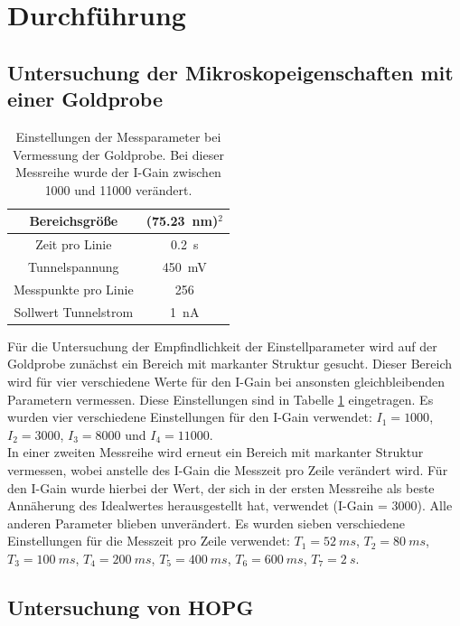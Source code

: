 \documentclass[12pt,a4paper]{article}
\begin{document}
\section{Durchführung}
\subsection{Untersuchung der Mikroskopeigenschaften mit einer Goldprobe}

\begin{table}
\centering
\begin{tabular}{|c|c|}
\hline 
Bereichsgröße & (\SI{75,23}{nm})$^2$ \\ 
\hline 
Zeit pro Linie & \SI{0,2}{s} \\
\hline 
Tunnelspannung & \SI{450}{mV} \\ 
\hline 
Messpunkte pro Linie & 256 \\
\hline 
Sollwert Tunnelstrom & \SI{1}{nA} \\
\hline 
\end{tabular} 
\caption{Einstellungen der Messparameter bei Vermessung der Goldprobe. Bei dieser Messreihe wurde der I-Gain zwischen 1000 und 11000 verändert.}
\label{tab:IGain_Einstellungen}
\end{table}

Für die Untersuchung der Empfindlichkeit der Einstellparameter wird auf der Goldprobe zunächst ein Bereich mit markanter Struktur gesucht. Dieser Bereich wird für vier verschiedene Werte für den I-Gain bei ansonsten gleichbleibenden Parametern vermessen. Diese Einstellungen sind in Tabelle \ref{tab:IGain_Einstellungen} eingetragen. Es wurden vier verschiedene Einstellungen für den I-Gain verwendet: $I_1 = 1000$, $I_2 = 3000$, $I_3 = 8000$ und $I_4 = 11000$.\\
In einer zweiten Messreihe wird erneut ein Bereich mit markanter Struktur vermessen, wobei anstelle des I-Gain die Messzeit pro Zeile verändert wird. Für den I-Gain wurde hierbei der Wert, der sich in der ersten Messreihe als beste Annäherung des Idealwertes herausgestellt hat, verwendet (I-Gain = 3000). Alle anderen Parameter blieben unverändert. Es wurden sieben verschiedene Einstellungen für die Messzeit pro Zeile verwendet: $T_1 = \SI{52}{ms}$, $T_2 = \SI{80}{ms}$, $T_3 = \SI{100}{ms}$, $T_4 = \SI{200}{ms}$, $T_5 = \SI{400}{ms}$, $T_6 = \SI{600}{ms}$, $T_7 = \SI{2}{s}$.

\subsection{Untersuchung von HOPG}
\end{document}
